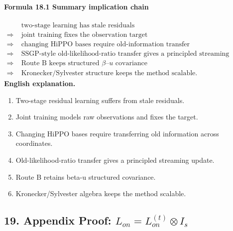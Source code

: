 \documentclass[12pt]{article}
\begin{document}
\paragraph{Formula 18.1 Summary implication chain}
\[
\begin{aligned}
&\text{two-stage learning has stale residuals}\\
\Rightarrow\;&\text{joint training fixes the observation target}\\
\Rightarrow\;&\text{changing HiPPO bases require old-information transfer}\\
\Rightarrow\;&\text{SSGP-style old-likelihood-ratio transfer gives a principled streaming update}\\
\Rightarrow\;&\text{Route B keeps structured }\beta\text{--}u\text{ covariance}\\
\Rightarrow\;&\text{Kronecker/Sylvester structure keeps the method scalable.}
\end{aligned}
\]
\textbf{English explanation.}
\begin{enumerate}[leftmargin=2em]
\item Two-stage residual learning suffers from stale residuals.
\item Joint training models raw observations and fixes the target.
\item Changing HiPPO bases require transferring old information across coordinates.
\item Old-likelihood-ratio transfer gives a principled streaming update.
\item Route B retains beta-u structured covariance.
\item Kronecker/Sylvester algebra keeps the method scalable.
\end{enumerate}

\subsection{19. Appendix Proof: \(L_{on}=L_{on}^{(t)}\otimes I_s\)}
\end{document}
